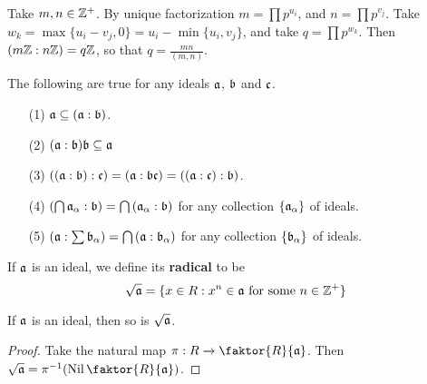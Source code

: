 \begin{example}\label{example_5.20}
  Take $m,n \in \Z^+$. By unique factorization $m=\prod{p^{u_i}}$, and
  $n=\prod{p^{v_j}}$. Take $w_k=\max{\{u_i-v_j,0\}}=u_i-\min{\{u_i,v_j\}}$, and
  take $q=\prod{p^{w_k}}$. Then $(m\Z:n\Z)=q\Z$, so that $q=\frac{mn}{(m,n)}$.
\end{example}

\begin{proposition}\label{proposition_5.5.12}
  The following are true for any ideals $\af$,  $\bf$ and  $\cf$.
  \begin{enumerate}
    \item[(1)] $\af \subseteq (\af:\bf)$.

    \item[(2)] $(\af:\bf)\bf \subseteq \af$

    \item[(3)] $((\af:\bf):\cf)=(\af:\bf\cf)=((\af:\cf):\bf)$.

    \item[(4)] $(\bigcap{\af_\a}:\bf)=\bigcap{(\af_\a:\bf)}$ for any collection
      $\{\af_\a\}$ of ideals.

    \item[(5)] $(\af:\sum{\bf_\a})=\bigcap{(\af:\bf_\a)}$ for any collection
      $\{\bf_\a\}$ of ideals.
  \end{enumerate}
\end{proposition}

\begin{definition}
  If $\af$ is an ideal, we define its \textbf{radical} to be
  \begin{equation*}
    \sqrt{\af}=\{x \in R : x^n \in \af \text{ for some } n \in \Z^+\}
  \end{equation*}
\end{definition}

\begin{proposition}\label{proposition_5.5.13}
  If $\af$ is an ideal, then so is $\sqrt{\af}$.
\end{proposition}
\begin{proof}
  Take the natural map $\pi:R \xrightarrow{} \faktor{R}{\af}$. Then
  $\sqrt{\af}=\inv{\pi}(\Nil{\faktor{R}{\af}})$.
\end{proof}

